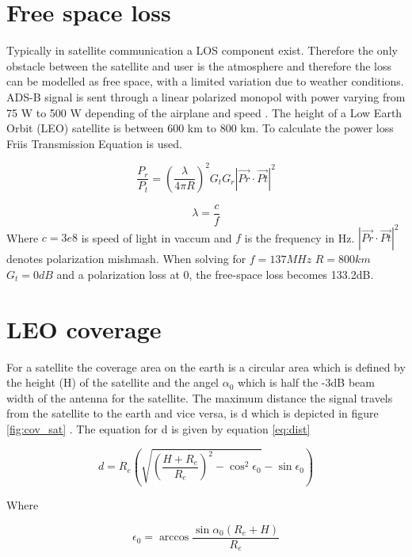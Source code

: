 \section{Free space loss}

Typically in satellite communication a LOS component exist. Therefore the only obstacle between the satellite and user is the atmosphere and therefore the loss can be modelled as free space, with a limited variation due to weather conditions. ADS-B signal is sent through a linear polarized monopol with power varying from 75 W to 500 W depending of the airplane and speed \citep{FlyingLab}. The height of a Low Earth Orbit (LEO) satellite is between 600 km to 800 km. To calculate the power loss Friis Transmission Equation is used. 

\begin{equation}
\frac{P_r}{P_t} = (\frac{\lambda}{4\pi R})^2 G_t G_r|\vec{Pr}\cdot \vec{Pt}|^2
\end{equation}

\begin{equation}
\lambda = \frac{c}{f}
\end{equation}
Where $c = 3e8$ is speed of light in vaccum and $ f$ is the frequency in Hz. $|\vec{Pr}\cdot \vec{Pt}|^2$ denotes polarization mishmash. When solving for $f = 137MHz$ $R=800km$  $G_t = 0 dB$ and a polarization loss at 0, the free-space loss becomes 133.2dB.

\section{LEO coverage}
For a satellite the coverage area on the earth is a circular area which is defined by the height (H) of the satellite and the angel $\alpha_0$ which is half the -3dB beam width of the antenna for the satellite. The maximum distance the signal travels from the satellite to the earth and vice versa, is d which is depicted in figure \ref{fig:cov_sat} \citep{Cakaj2014}. The equation for d is given by equation \ref{eq:dist} 

\begin{equation}
d=R_e(\sqrt{(\frac{H+R_e}{R_e})^2-\cos^2{\epsilon_0}}-\sin{\epsilon_0})
\end{equation}
\label{eq:dist}

Where

\begin{equation}
\epsilon_0 = \arccos{\frac{\sin{\alpha_0}(R_e+H)}{R_e}}
\end{equation}
\label{eq:dist2}

